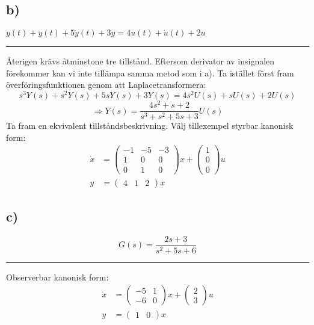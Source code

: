 \documentclass[12pt]{article}
\newcommand{\qline}{\hrule \vspace*{10pt}}
\begin{document}
\subsection*{b)}
$\dddot{y}(t) + \ddot{y}(t) + 5\dot{y}(t) + 3y = 4\ddot{u}(t) + \dot{u}(t) + 2u$
\qline
Återigen krävs åtminstone tre tillstånd. Eftersom derivator av insignalen förekommer kan vi inte tillämpa samma metod som i a). Ta istället först fram överföringsfunktionen genom att Laplacetransformera:
\begin{equation*}
  s^3Y(s) + s^2Y(s) + 5sY(s) + 3Y(s) = 4s^2U(s) + sU(s) + 2U(s)
\end{equation*}
\begin{equation*}
  \Rightarrow Y(s) = \frac{4s^2 + s + 2}{s^3 + s^2 + 5s + 3}U(s)
\end{equation*}
Ta fram en ekvivalent tillståndsbeskrivning. Välj tillexempel styrbar kanonisk form:
\begin{align*}
  \dot{x} &=
  \begin{pmatrix}
    -1 & -5 & -3 \\
    1 & 0 & 0 \\
    0 & 1 & 0
  \end{pmatrix}x +
            \begin{pmatrix}
              1 \\
              0 \\
              0
            \end{pmatrix}u \\
  y &=
      \begin{pmatrix}
        4 & 1 & 2
      \end{pmatrix}x
\end{align*}

\subsection*{c)}
\begin{equation*}
  G(s) = \frac{2s+3}{s^2+5s+6}
\end{equation*}
\qline
Observerbar kanonisk form:
\begin{align*}
  \dot{x} &=
  \begin{pmatrix}
    -5 & 1 \\
    -6 & 0
  \end{pmatrix}x +
            \begin{pmatrix}
              2 \\
              3
            \end{pmatrix}u \\
  y &=
      \begin{pmatrix}
        1 & 0
      \end{pmatrix}x
\end{align*}
\end{document}
